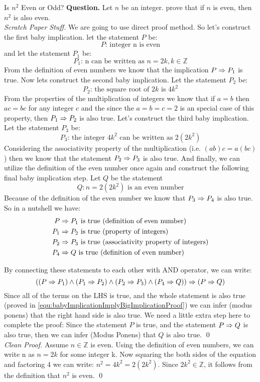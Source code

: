 \begin{example}{Is $ n^2 $ Even or Odd?}
	\textbf{Question.} Let $ n $ be an integer. prove that if $ n $ is even, then $ n^2 $ is also even. \\

	\emph{Scratch Paper Stuff.} We are going to use direct proof method. So let's construct the first baby implication. let the statement $ P $ be:
	\[ P \text{: integer n is even} \]
	and let the statement $ P_1 $ be:
	\[ P_1 \text{: n can be written as } n=2k, k \in \mathbb{Z} \]
	From the definition of even numbers we know that the implication $ P \Rightarrow P_1 $ is true. Now lets construct the second baby implication. Let the statement $ P_2 $ be:
	\[ P_2 \text{: the square root of } 2k \text{ is } 4k^2  \]
	From the properties of the multiplication of integers we know that if $ a=b $ then $ ac = bc $ for any integer $ c $ and the since the $ a=b=c=2 $ is an special case of this property, then $ P_1 \Rightarrow P_2 $ is also true. Let's construct the third baby implication. Let the statement $ P_3 $ be:
	\[ P_3 \text{: the integer } 4k^2 \text{ can be written as } 2(2k^2)\]
	Considering the associativity property of the multiplication (i.e. $ (ab)c = a(bc) $) then we know that the statement $ P_2 \Rightarrow P_3 $ is also true.
	And finally, we can utilize the definition of the even number once again and construct the following final baby implication step. Let $ Q $ be the statement
	\[ Q: n=2(2k^2) \text{ is an even number} \]
	Because of the definition of the even number we know that $ P_3 \Rightarrow P_4 $ is also true. So in a nutshell we have:
	\begin{align*}
		P &\Rightarrow P_1 \text{ is true (definition of even number)} \\
		P_1 &\Rightarrow P_2 \text{ is true (property of integers)} \\ 
		P_2 &\Rightarrow P_3 \text{ is true (associativity property of integers)} \\
		P_4 &\Rightarrow Q \text{ is true (definition of even number)}
	\end{align*}

	By connecting these statements to each other with AND operator, we can write:
	\[ ((P \Rightarrow P_1 ) \wedge (P_1 \Rightarrow P_2) \wedge (P_2 \Rightarrow P_3) \wedge (P_4 \Rightarrow Q)) \Rightarrow (P \Rightarrow Q) \]
	Since all of the terms on the LHS is true, and the whole statement is also true (proved in \ref{equ:babyImplicationImplyBigImplicationProof}) we can infer (modus ponens) that the right hand side is also true. We need a little extra step here to complete the proof: Since the statement $ P $ is true, and the statement $ P \Rightarrow Q $ is also true, then we can infer (Modus Ponens) that $ Q $ is also true. \qed \\
	
	\emph{Clean Proof.} Assume $ n \in \mathbb{Z} $ is even. Using the definition of even numbers, we can write n as $ n=2k $ for some integer k. Now squaring the both sides of the equation and factoring 4 we can write: $ n^2 = 4k^2 = 2(2k^2) $. Since $ 2k^2 \in \mathbb{Z} $, it follows from the definition that $ n^2 $ is even. \qed
	
\end{example}


